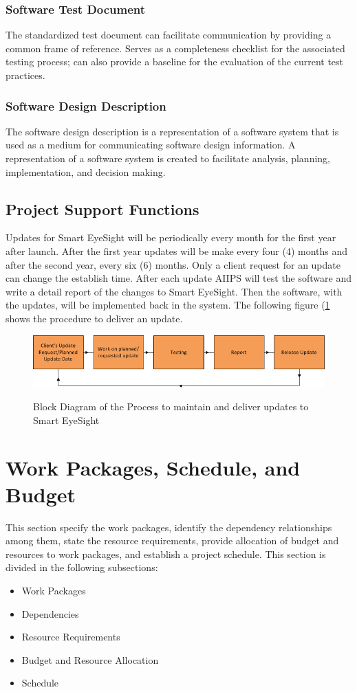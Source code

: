 \documentclass[12pt]{article}
\begin{document}
\subsubsection{Software Test Document}
The standardized test document can facilitate communication by providing a common frame of reference. Serves as a completeness checklist for the associated testing process; can also provide a baseline for the evaluation of the current test practices.

\subsubsection{Software Design Description}
The software design description is a representation of a software system that is used as a medium for communicating software design information. A representation of a software system is created to facilitate analysis, planning, implementation, and decision making.

\subsection{Project Support Functions}
Updates for Smart EyeSight will be periodically every month for the first year after launch. After the first year updates will be make every four (4) months and after the second year, every six (6) months. Only a client request for an update can change the establish time. After each update AIIPS will test the software and write a detail report of the changes to Smart EyeSight. Then the software, with the updates, will be implemented back in the system. The following figure (\ref{support} shows the procedure to deliver an update.

\begin{figure}[H]\centering
  \includegraphics[width=6.0in]{project_support}\\
  \caption{Block Diagram of the Process to maintain and deliver updates to Smart EyeSight}\label{support}
  \end{figure}

\section{Work Packages, Schedule, and Budget}
This section specify the work packages, identify the dependency relationships among them, state the resource requirements, provide allocation of budget and resources to work packages, and establish a project schedule. This section is divided in the following subsections:
\begin{itemize}
  \item Work Packages
  \item Dependencies
  \item Resource Requirements
  \item Budget and Resource Allocation
  \item Schedule
\end{itemize}
\end{document}
